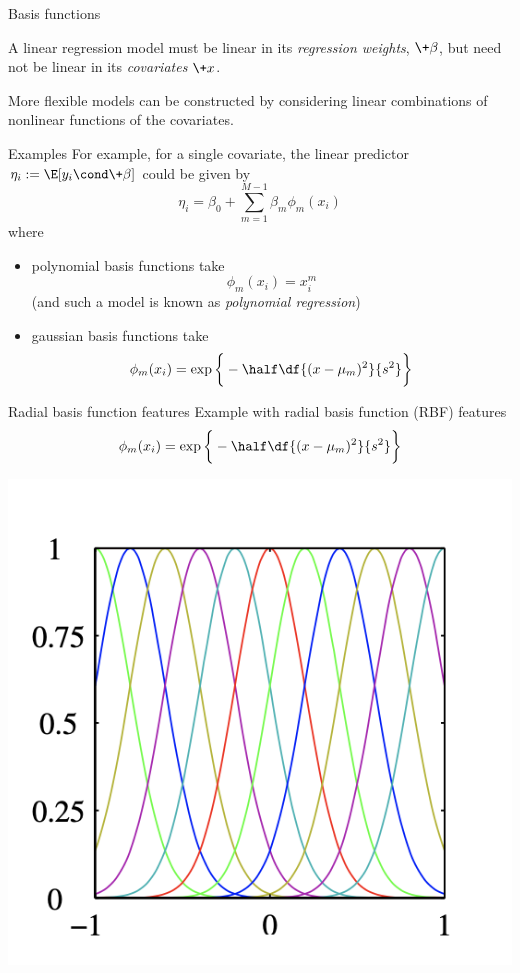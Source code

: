 \documentclass[10pt]{beamer}
\begin{document}
\begin{frame}{Basis functions}
	
A linear regression model must be linear in its \textit{regression weights}, $\+\beta$, but need not be linear in its \textit{covariates} $\+x$.

More flexible models can be constructed by considering linear combinations of nonlinear functions of the covariates.



\begin{sblock}{Examples}
\pause \scriptsize 
For example, for a single covariate, the linear predictor $\eta_i := \E[y_i \cond \+\beta]$ could be given by
 \[ \eta_i  = \beta_0 + \sum_{m=1}^{M-1} \beta_{m} \phi_m(x_i)\]
 where
\begin{itemize}
\item polynomial basis functions take
 \[ \phi_m(x_i) = x_i^m \] 
 \hfill {\tiny (and such a model is known as \textit{polynomial regression})}
\item gaussian basis functions take
\[ \phi_m(x_i) = \exp \bigg\{ -\half \df{(x-\mu_m)^2}{s^2} \bigg\} \] 
\end{itemize}
\end{sblock}
\end{frame}

\begin{frame}{Radial basis function features}
Example with radial basis function (RBF) features
\[ \phi_m(x_i) = \exp \bigg\{ -\half \df{(x-\mu_m)^2}{s^2} \bigg\} \] 

\begin{center}
\includegraphics[width=.5\textwidth]{images/bishop_RBF_basis}	
\end{center}

\end{frame}
\end{document}
